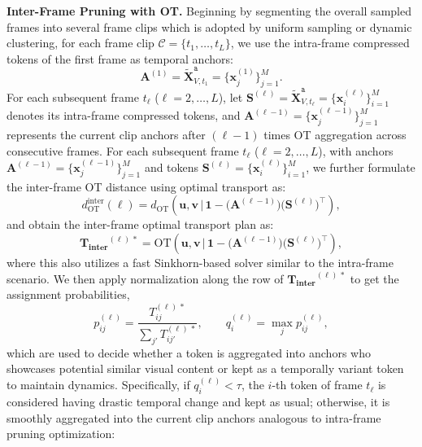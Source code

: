\noindent \textbf{Inter-Frame Pruning with OT.}
Beginning by segmenting the overall sampled frames into several frame clips which is adopted by uniform sampling or dynamic clustering, for each frame clip $\mathcal{C} = \{t_1,\dots,t_L\}$, we use the intra-frame compressed tokens of the first frame as temporal anchors:
\[
\mathbf{A}^{(1)} = \tilde{\mathbf{X}}^{\texttt{a}}_{V,t_1}
= \{\mathbf{x}^{(1)}_j\}_{j=1}^M.
\]
%
For each subsequent frame $t_\ell$ ($\ell = 2,\dots,L$), let
$\mathbf{S}^{(\ell)} = \tilde{\mathbf{X}}^{\texttt{a}}_{V,t_\ell}
= \{\mathbf{x}^{(\ell)}_i\}_{i=1}^{M}$ denotes its intra-frame
compressed tokens, and $\mathbf{A}^{(\ell-1)} = \{\mathbf{x}^{(\ell-1)}_j\}_{j=1}^{M}$ represents the current clip anchors after $(\ell-1)$ times OT aggregation across consecutive frames.
%
For each subsequent frame $t_\ell$ ($\ell=2,\dots,L$), with anchors
$\mathbf{A}^{(\ell-1)} = \{\mathbf{x}^{(\ell-1)}_j\}_{j=1}^{M}$ and
tokens $\mathbf{S}^{(\ell)} = \{\mathbf{x}^{(\ell)}_i\}_{i=1}^{M}$,
we further formulate the inter-frame OT distance using optimal transport as:
\begin{equation}
    d^{\text{inter}}_{\text{OT}}(\ell)
    =
    d_{\text{OT}}\!\left(
        \bm{u}, \bm{v}
        \,\big|\,
        \bm{1}
        -
        \big(\mathbf{A}^{(\ell-1)}\big)
        \big(\mathbf{S}^{(\ell)}\big)^\top
    \right),
\end{equation}
and obtain the inter-frame optimal transport plan as:
\begin{equation}
    \bm{T_{inter}}^{(\ell)\,*}
    =
    \mathrm{OT}\!\left(
        \bm{u}, \bm{v}
        \,\big|\,
        \bm{1}
        -
        \big(\mathbf{A}^{(\ell-1)}\big)
        \big(\mathbf{S}^{(\ell)}\big)^\top
    \right),
\end{equation}
where this also utilizes a fast Sinkhorn-based solver similar to the intra-frame scenario. We then apply normalization along the row of $\bm{T_{inter}}^{(\ell)\,*}$ to get the assignment probabilities,
\begin{equation}
    p^{(\ell)}_{ij}
    =
    \frac{T^{(\ell)\,*}_{ij}}{\sum_{j'} T^{(\ell)\,*}_{ij'}},
    \qquad
    q^{(\ell)}_i = \max_j p^{(\ell)}_{ij},
\end{equation}
which are used to decide whether a token is aggregated into anchors
who showcases potential similar visual content or kept as a temporally variant token to maintain dynamics.
Specifically, if $q^{(\ell)}_i < \tau$, the $i$-th token of frame $t_\ell$
is considered having drastic temporal change and kept as usual; otherwise, it is smoothly aggregated into the current clip anchors analogous to intra-frame pruning optimization:

